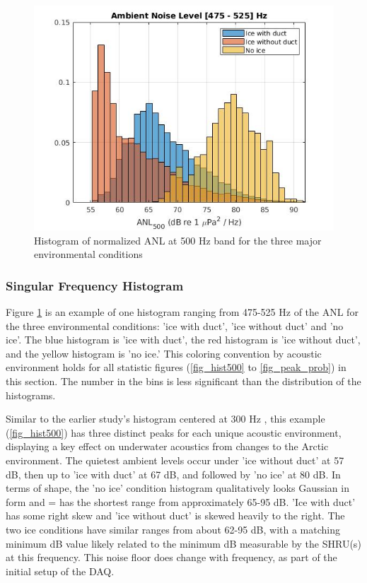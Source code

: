 \begin{figure}[h]
\centering
\includegraphics[scale=0.6]{Figures/ANL_500.jpg}
\caption{Histogram of normalized ANL at 500 Hz band for the three major environmental conditions}
\label{fig_hist500}
\end{figure}

\subsubsection{Singular Frequency Histogram}
Figure \ref{fig_hist500} is an example of one histogram ranging from 475-525 Hz of the ANL for the three environmental conditions: 'ice with duct',  'ice without duct' and 'no ice'.  The blue histogram is 'ice with duct', the red histogram is 'ice without duct', and the yellow histogram is 'no ice.'  This coloring convention by acoustic environment holds for all statistic figures (\autoref{fig_hist500} to \autoref{fig_peak_prob}) in this section. The number in the bins is less significant than the distribution of the histograms. 

Similar to the earlier study's histogram centered at 300 Hz \parencite{Bonnel2021}, this example (\autoref{fig_hist500}) has three distinct peaks for each unique acoustic environment, displaying a key effect on underwater acoustics from changes to the Arctic environment. The quietest ambient levels occur under 'ice without duct' at 57 dB, then up to 'ice with duct' at 67 dB, and followed by 'no ice' at 80 dB. In terms of shape, the 'no ice' condition histogram qualitatively looks Gaussian in form and = has the shortest range from approximately 65-95 dB. 'Ice with duct' has some right skew and 'ice without duct' is skewed heavily to the right. The two ice conditions have similar ranges from about 62-95 dB, with a matching minimum dB value likely related to the minimum dB measurable by the SHRU(s) at this frequency. This noise floor does change with frequency, as part of the initial setup of the DAQ. \parencite{DAQprocess} %

